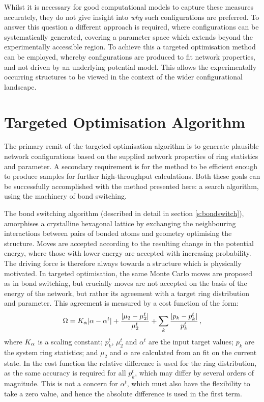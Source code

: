 Whilst it is necessary for good computational models to capture these measures accurately, they do not give insight into \textit{why} such configurations are preferred. 
To answer this question a different approach is required, where configurations can be systematically generated, covering a parameter space which extends beyond the experimentally accessible region.
To achieve this a targeted optimisation method can be employed, whereby configurations are produced to fit network properties, and not driven by an underlying potential model.
This allows the experimentally occurring structures to be viewed in the context of the wider configurational landscape.

\section{Targeted Optimisation Algorithm}
\label{s:targetedoptalg}

The primary remit of the targeted optimisation algorithm is to generate plausible network configurations based on the supplied network properties of ring statistics and \aw{} parameter.
A secondary requirement is for the method to be efficient enough to produce samples for further high\--throughput calculations.
Both these goals can be successfully accomplished with the method presented here: a \mc{} search algorithm, using the machinery of bond switching.

The bond switching algorithm (described in detail in section \ref{s:bondswitch}), amorphises a crystalline hexagonal lattice by exchanging the neighbouring interactions between pairs of bonded atoms and geometry optimising the structure.
Moves are accepted according to the resulting change in the potential energy, where those with lower energy are accepted with increasing probability.
The driving force is therefore always towards a structure which is physically motivated.
In targeted optimisation, the same Monte Carlo moves are proposed as in bond switching, but crucially moves are not accepted on the basis of the energy of the network, but rather its agreement with a target ring distribution and \aw{} parameter.
This agreement is measured by a cost function of the form:
\begin{equation}
	\label{eq:costfunc}
	\Omega=K_\alpha\lvert\alpha-\alpha^t\rvert+\frac{\lvert\mu_2-\mu_2^t\rvert}{\mu_2^t}+\sum\limits_k\frac{\lvert p_k-p_k^t\rvert}{p_k^t}\,,
\end{equation} 
where $K_\alpha$ is a scaling constant; $p_k^t$, $\mu_2^t$ and $\alpha^t$ are the input target values; $p_k$ are the system ring statistics; and $\mu_2$ and $\alpha$ are calculated from an \aw{} fit on the current state.
In the cost function the relative difference is used for the ring distribution, as the same accuracy is required for all $p_k^t$, which may differ by several orders of magnitude. 
This is not a concern for $\alpha^t$, which must also have the flexibility to take a zero value, and hence the absolute difference is used in the first term. 


